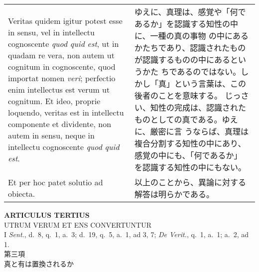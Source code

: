 \documentclass[10pt]{jsarticle} %
\begin{document}
\begin{longtable}{p{21em}p{21em}}
\\

Veritas quidem igitur potest esse in sensu, vel in intellectu
cognoscente {\itshape quod quid est}, ut in quadam re vera, non autem ut
cognitum in cognoscente, quod importat nomen {\itshape veri}; perfectio
enim intellectus est verum ut cognitum. Et ideo, proprie loquendo,
veritas est in intellectu componente et dividente, non autem in sensu,
neque in intellectu cognoscente {\itshape quod quid est}.

&

ゆえに、真理は、感覚や「何であるか」を認識する知性の中に、一種の真の事物
の中にあるかたちであり、認識されたものが認識するものの中にあるというかた
ちであるのではない。しかし「真」という言葉は、この後者のことを意味する。
じっさい、知性の完成は、認識されたものとしての真である。ゆえに、厳密に言
うならば、真理は複合分割する知性の中にあり、感覚の中にも、「何であるか」
を認識する知性の中にもない。

\\


Et per hoc patet solutio ad obiecta.

&

以上のことから、異論に対する解答は明らかである。

\end{longtable}
\newpage





\begin{center}
 {\Large {\bf ARTICULUS TERTIUS}}\\
 {\large UTRUM VERUM ET ENS CONVERTUNTUR}\\
 {\footnotesize I {\itshape Sent.}, d.~8, q.~1, a.~3; d.~19, q.~5, a.~1,
 ad 3, 7; {\itshape De Verit.}, q.~1, a.~1; a.~2, ad 1.}\\
 {\Large 第三項\\真と有は置換されるか}
\end{center}
\end{document}

